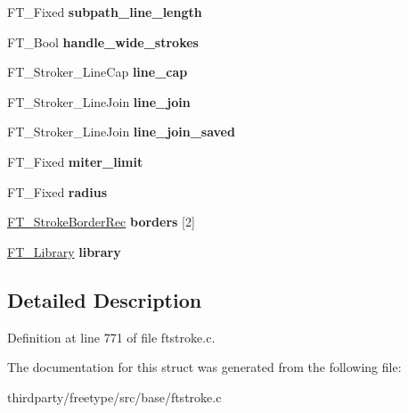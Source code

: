 \begin{DoxyCompactItemize}
\item 
\mbox{\label{struct_f_t___stroker_rec___a658b73ff2c36ddb2db3b048a46d944a2}} 
F\+T\+\_\+\+Fixed {\bfseries subpath\+\_\+line\+\_\+length}
\item 
\mbox{\label{struct_f_t___stroker_rec___a09c20d4f17b3a7da56f081d1e0a5c6e3}} 
F\+T\+\_\+\+Bool {\bfseries handle\+\_\+wide\+\_\+strokes}
\item 
\mbox{\label{struct_f_t___stroker_rec___a49f0d141f74c43d1e361925985e7ca41}} 
F\+T\+\_\+\+Stroker\+\_\+\+Line\+Cap {\bfseries line\+\_\+cap}
\item 
\mbox{\label{struct_f_t___stroker_rec___a7db150affc30eaf5fa766603820b9d47}} 
F\+T\+\_\+\+Stroker\+\_\+\+Line\+Join {\bfseries line\+\_\+join}
\item 
\mbox{\label{struct_f_t___stroker_rec___ae727022453f4c5da118af665af08df97}} 
F\+T\+\_\+\+Stroker\+\_\+\+Line\+Join {\bfseries line\+\_\+join\+\_\+saved}
\item 
\mbox{\label{struct_f_t___stroker_rec___a6c84640cb3ae6032be890b564e0d86c5}} 
F\+T\+\_\+\+Fixed {\bfseries miter\+\_\+limit}
\item 
\mbox{\label{struct_f_t___stroker_rec___a05654ee8a6638c83c733822a8c93df04}} 
F\+T\+\_\+\+Fixed {\bfseries radius}
\item 
\mbox{\label{struct_f_t___stroker_rec___ad0bc5fe6112ab4dc78f059e41604a4de}} 
\hyperlink{struct_f_t___stroke_border_rec__}{F\+T\+\_\+\+Stroke\+Border\+Rec} {\bfseries borders} \mbox{[}2\mbox{]}
\item 
\mbox{\label{struct_f_t___stroker_rec___ace57849503a1915de8d88004c65ddc26}} 
\hyperlink{struct_f_t___library_rec__}{F\+T\+\_\+\+Library} {\bfseries library}
\end{DoxyCompactItemize}


\subsection{Detailed Description}


Definition at line 771 of file ftstroke.\+c.



The documentation for this struct was generated from the following file\+:\begin{DoxyCompactItemize}
\item 
thirdparty/freetype/src/base/ftstroke.\+c\end{DoxyCompactItemize}
